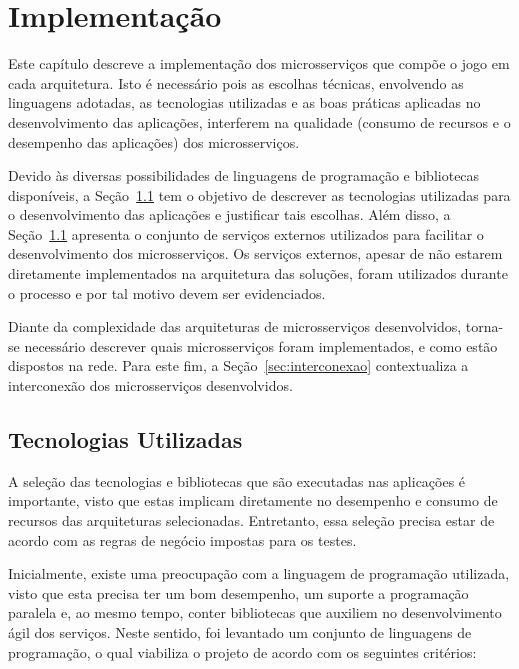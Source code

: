 \chapter{Implementação}
\label{cap5}



Este capítulo descreve a implementação dos microsserviços que compõe o jogo em cada arquitetura.
%
Isto é necessário pois as escolhas técnicas, envolvendo as linguagens adotadas, as tecnologias utilizadas e as boas práticas aplicadas no desenvolvimento das aplicações, interferem na qualidade (consumo de recursos e o desempenho das aplicações) dos microsserviços.


Devido às diversas possibilidades de linguagens de programação e bibliotecas disponíveis, a Seção~\ref{sec:tecnologias} tem o objetivo de descrever as tecnologias utilizadas para o desenvolvimento das aplicações e justificar tais escolhas.
%
Além disso, a Seção~\ref{sec:tecnologias} apresenta o conjunto de serviços externos utilizados para facilitar o desenvolvimento dos microsserviços.
%
Os serviços externos, apesar de não estarem diretamente implementados na arquitetura das soluções, foram utilizados durante o processo e por tal motivo devem ser evidenciados.



Diante da complexidade das arquiteturas de microsserviços desenvolvidos, torna-se necessário descrever quais microsserviços foram implementados, e como estão dispostos na rede.
%
Para este fim, a Seção~\ref{sec:interconexao} contextualiza a interconexão dos microsserviços desenvolvidos.



\section{Tecnologias Utilizadas}
\label{sec:tecnologias}



A seleção das tecnologias e bibliotecas que são executadas nas aplicações é importante, visto que estas implicam diretamente no desempenho e consumo de recursos das arquiteturas selecionadas.
%
Entretanto, essa seleção precisa estar de acordo com as regras de negócio impostas para os testes.



Inicialmente, existe uma preocupação com a linguagem de programação utilizada, visto que esta precisa ter um bom desempenho, um suporte a programação paralela e, ao mesmo tempo, conter bibliotecas que auxiliem no desenvolvimento ágil dos serviços.
%
Neste sentido, foi levantado um conjunto de linguagens de programação, o qual viabiliza o projeto de acordo com os seguintes critérios:



